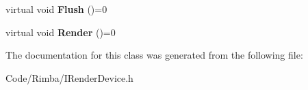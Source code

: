\begin{DoxyCompactItemize}
\item 
virtual void {\bfseries Flush} ()=0\hypertarget{class_i_render_device_ace33d49018eb3b4f120d07e73a924652}{}\label{class_i_render_device_ace33d49018eb3b4f120d07e73a924652}

\item 
virtual void {\bfseries Render} ()=0\hypertarget{class_i_render_device_aa6aff224e369de9617b9432c56c5a8be}{}\label{class_i_render_device_aa6aff224e369de9617b9432c56c5a8be}

\end{DoxyCompactItemize}


The documentation for this class was generated from the following file\+:\begin{DoxyCompactItemize}
\item 
Code/\+Rimba/I\+Render\+Device.\+h\end{DoxyCompactItemize}
